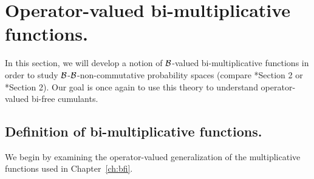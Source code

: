\section{Operator-valued bi-multiplicative functions.}
\label{sec:OperatorValuedBiMultiplicativeFunctions}





In this section, we will develop a notion of $\mathcal{B}$-valued bi-multiplicative functions in order to study $\mathcal{B}$-$\mathcal{B}$-non-commutative probability spaces (compare \cite{nica2002operator}*{Section 2} or \cite{speicher1998combinatorial}*{Section 2}).
Our goal is once again to use this theory to understand operator-valued bi-free cumulants.

\subsection{Definition of bi-multiplicative functions.}
We begin by examining the operator-valued generalization of the multiplicative functions used in Chapter~\ref{ch:bfi}.

